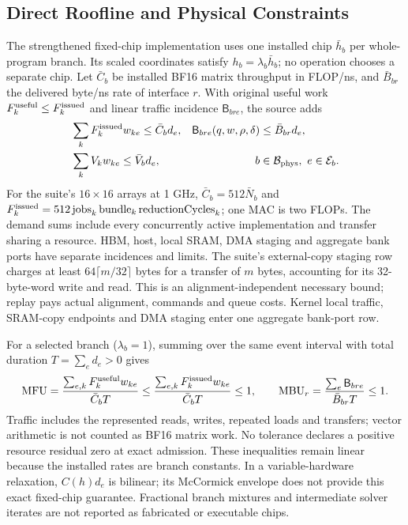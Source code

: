 \subsection{Direct Roofline and Physical Constraints}
\label{app:physical_rooflines}
The strengthened fixed-chip implementation uses one installed chip $\bar h_b$ per whole-program branch.
Its scaled coordinates satisfy $h_b=\lambda_b\bar h_b$; no operation chooses a separate chip.
Let $\bar C_b$ be installed BF16 matrix throughput in FLOP/ns, and $\bar B_{br}$ the delivered byte/ns rate of interface $r$.
With original useful work $F_k^{\rm useful}\le F_k^{\rm issued}$ and linear traffic incidence $\mathsf B_{bre}$, the source adds
\begin{align}
 &\sum_k F_k^{\rm issued}w_{ke}\le\bar C_b d_e,
 &\mathsf B_{bre}(q,w,\rho,\delta)&\le\bar B_{br}d_e,\nonumber\\
 &\sum_k V_kw_{ke}\le\bar V_b d_e,
 &b&\in\mathcal B_{\rm phys},\ e\in\mathcal E_b .
 \label{eq:hard_roofline_rows}
\end{align}
For the suite's $16\times16$ arrays at 1 GHz, $\bar C_b=512\bar N_b$ and $F_k^{\rm issued}=512\,\mathrm{jobs}_k\,\mathrm{bundle}_k\, \mathrm{reductionCycles}_k$; one MAC is two FLOPs.
The demand sums include every concurrently active implementation and transfer sharing a resource.
HBM, host, local SRAM, DMA staging and aggregate bank ports have separate incidences and limits.
The suite's external-copy staging row charges at least $64\lceil m/32\rceil$ bytes for a transfer of $m$ bytes, accounting for its 32-byte-word write and read.
This is an alignment-independent necessary bound; replay pays actual alignment, commands and queue costs.
Kernel local traffic, SRAM-copy endpoints and DMA staging enter one aggregate bank-port row.

For a selected branch ($\lambda_b=1$), summing over the same event interval with total duration $T=\sum_e d_e>0$ gives
\begin{equation}
 \mathrm{MFU}=\frac{\sum_{e,k}F_k^{\rm useful}w_{ke}}{\bar C_bT}
 \le\frac{\sum_{e,k}F_k^{\rm issued}w_{ke}}{\bar C_bT}\le1,
 \qquad
 \mathrm{MBU}_r=\frac{\sum_e\mathsf B_{bre}}{\bar B_{br}T}\le1.
 \label{eq:hard_roofline_guarantee}
\end{equation}
Traffic includes the represented reads, writes, repeated loads and transfers; vector arithmetic is not counted as BF16 matrix work.
No tolerance declares a positive resource residual zero at exact admission.
These inequalities remain linear because the installed rates are branch constants.
In a variable-hardware relaxation, $C(h)d_e$ is bilinear; its McCormick envelope does not provide this exact fixed-chip guarantee.
Fractional branch mixtures and intermediate solver iterates are not reported as fabricated or executable chips.

